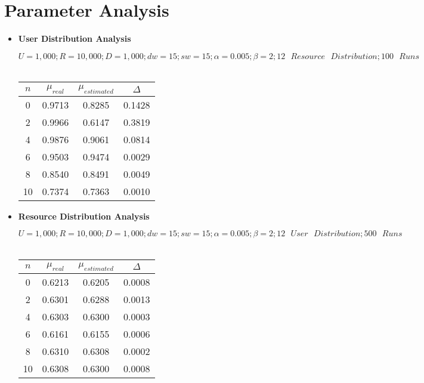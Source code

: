 \documentclass[12pt,a4paper]{report}
\begin{document}
	\clearpage
	
	\section{Parameter Analysis}

	\begin{itemize}

	\item \textbf{User Distribution Analysis}

\begin{center}
\textup{\textbf{$U=1,000; R=10,000; D=1,000; dw=15; sw=15; \alpha=0.005; \beta=2; 12\text{ }Resource\text{ }Distribution; 100\text{ }Runs$\\}}
\textup{\\}
\begin{tabular}{|c|c|c|c|}
\hline
\textbf{$n$} & \textbf{$\mu_{real}$} & \textbf{$\mu_{estimated}$} & \textbf{$\Delta$}\\
\hline
0 & 0.9713 & 0.8285 & 0.1428 \\
\hline
2 & 0.9966 & 0.6147 & 0.3819 \\
\hline
4 & 0.9876 & 0.9061 & 0.0814 \\
\hline
6 & 0.9503 & 0.9474 & 0.0029 \\
\hline
8 & 0.8540 & 0.8491 & 0.0049 \\
\hline
10 & 0.7374 & 0.7363 & 0.0010 \\
\hline
\end{tabular}
\end{center}

	\item \textbf{Resource Distribution Analysis}

\begin{center}
\textup{\textbf{$U=1,000; R=10,000; D=1,000; dw=15; sw=15; \alpha=0.005; \beta=2; 12\text{ }User\text{ }Distribution; 500\text{ }Runs$\\}}
\textup{\\}
\begin{tabular}{|c|c|c|c|}
\hline
\textbf{$n$} & \textbf{$\mu_{real}$} & \textbf{$\mu_{estimated}$} & \textbf{$\Delta$}\\
\hline
0 & 0.6213 & 0.6205 & 0.0008 \\
\hline
2 & 0.6301 & 0.6288 & 0.0013 \\
\hline
4 & 0.6303 & 0.6300 & 0.0003 \\
\hline
6 & 0.6161 & 0.6155 & 0.0006 \\
\hline
8 & 0.6310 & 0.6308 & 0.0002 \\
\hline
10 & 0.6308 & 0.6300 & 0.0008 \\
\hline
\end{tabular}
\end{center}


\end{itemize}
\end{document}
